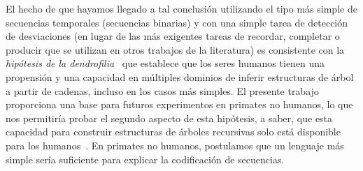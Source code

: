 El hecho de que hayamos llegado a tal conclusión utilizando el tipo más simple de secuencias temporales (secuencias binarias) y con una simple tarea de detección de desviaciones (en lugar de las más exigentes tareas de recordar, completar o producir que se utilizan en otros trabajos de la literatura) es consistente con la \textit{hipótesis de la dendrofilia}~\cite{f8} que establece que los seres humanos tienen una propensión y una capacidad en múltiples dominios de inferir estructuras de árbol a partir de cadenas, incluso en los casos más simples. El presente trabajo proporciona una base para futuros experimentos en primates no humanos, lo que nos permitiría probar el segundo aspecto de esta hipótesis, a saber, que esta capacidad para construir estructuras de árboles recursivas solo está disponible para los humanos~\cite{f4,f6,f8}. En primates no humanos, postulamos que un lenguaje más simple sería suficiente para explicar la codificación de secuencias.


